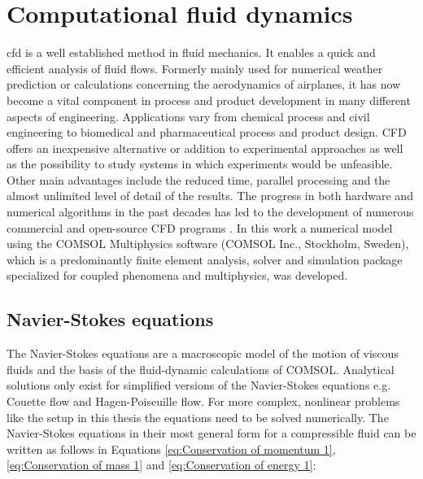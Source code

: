 \section{Computational fluid dynamics}
\label{sec:CFD}
\Gls{cfd} is a well established method in fluid mechanics. It enables a quick and efficient analysis of fluid flows. Formerly mainly used for numerical weather prediction or calculations concerning the aerodynamics of airplanes, it has now become a vital component in process and
product development in many different aspects of engineering. Applications vary from chemical process and civil engineering to biomedical and pharmaceutical
process and product design. CFD offers an inexpensive alternative or addition to experimental approaches as well as the possibility to study systems in which experiments would be unfeasible. Other main advantages include the reduced time, parallel processing and the almost unlimited level of detail of the results. The progress in both hardware and numerical algorithms in the past decades has led to the development of numerous commercial and open-source CFD programs \cite{ghia1982high}. In this work a numerical model using the COMSOL Multiphysics  software (COMSOL Inc., Stockholm, Sweden), which is a predominantly finite element analysis, solver and simulation package specialized for coupled phenomena and multiphysics, was developed.

\subsection{Navier-Stokes equations}
\label{subsec:Navier_Stokes}
The Navier-Stokes equations are a macroscopic model of the motion of viscous fluids and the basis of the fluid-dynamic calculations of COMSOL. Analytical solutions only exist for simplified versions of the Navier-Stokes equations e.g. Couette flow and Hagen-Poiseuille flow. For more complex, nonlinear problems like the setup in this thesis the equations need to be solved numerically. The Navier-Stokes equations in their most general form for a compressible fluid can be written as follows in Equations \ref{eq:Conservation of momentum 1}, \ref{eq:Conservation of mass 1} and \ref{eq:Conservation of energy 1}:


